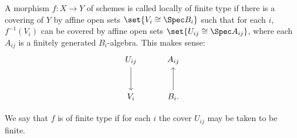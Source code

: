 A morphism $f\colon X\to Y$ of schemes is called locally of finite type
if there is a covering of $Y$ by affine open sets $\set{V_i \cong \Spec B_i}$
such that for each $i$, $f^{-1}(V_i)$ can be covered by affine open sets
$\set{U_{ij}\cong \Spec A_{ij}}$, where each $A_{ij}$ is a finitely generated
$B_i$-algebra. This makes sense:
\[\begin{tikzcd}[row sep=1cm, column sep=1cm]
	U_{ij}\ar[d]& A_{ij}\\
	V_i & B_i.\ar[u]
\end{tikzcd}\]

We say that $f$ is of finite type if for each $i$ the cover $U_{ij}$ may be
taken to be finite.
